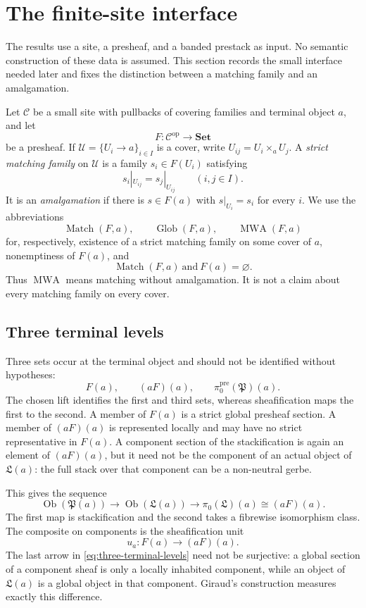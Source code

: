 \section{The finite-site interface}\label{sec:preliminaries}

The results use a site, a presheaf, and a banded prestack as input.  No
semantic construction of these data is assumed.  This section records the
small interface needed later and fixes the distinction between a matching
family and an amalgamation.

Let \(\mathcal C\) be a small site with pullbacks of covering families and
terminal object \(a\), and let
\[
 F:\mathcal C^{\mathrm{op}}\longrightarrow\mathbf {Set}
\]
be a presheaf.  If \(\mathcal U=\{U_i\to a\}_{i\in I}\) is a cover, write
\(U_{ij}=U_i\times_aU_j\).  A \emph{strict matching family} on
\(\mathcal U\) is a family \(s_i\in F(U_i)\) satisfying
\[
 s_i|_{U_{ij}}=s_j|_{U_{ij}}
 \qquad(i,j\in I).
\]
It is an \emph{amalgamation} if there is \(s\in F(a)\) with
\(s|_{U_i}=s_i\) for every \(i\).  We use the abbreviations
\[
 \operatorname{Match}(F,a),\qquad
 \operatorname{Glob}(F,a),\qquad
 \operatorname{MWA}(F,a)
\]
for, respectively, existence of a strict matching family on some cover of
\(a\), nonemptiness of \(F(a)\), and
\[
 \operatorname{Match}(F,a)\ \text{and}\ F(a)=\varnothing.
\]
Thus \(\operatorname{MWA}\) means matching without amalgamation.  It is not
a claim about every matching family on every cover.

\subsection*{Three terminal levels}

Three sets occur at the terminal object and should not be identified without
hypotheses:
\[
 F(a),\qquad (aF)(a),\qquad
 \pi_0^{\mathrm{pre}}(\mathfrak P)(a).
\]
The chosen lift identifies the first and third sets, whereas sheafification
maps the first to the second.  A member of \(F(a)\) is a strict global
presheaf section.  A member of \((aF)(a)\) is represented locally and may
have no strict representative in \(F(a)\).  A component section of the
stackification is again an element of \((aF)(a)\), but it need not be the
component of an actual object of \(\mathfrak L(a)\): the full stack over
that component can be a non-neutral gerbe.

This gives the sequence
\begin{equation}\label{eq:three-terminal-levels}
 \operatorname{Ob}(\mathfrak P(a))
 \longrightarrow
 \operatorname{Ob}(\mathfrak L(a))
 \longrightarrow
 \pi_0(\mathfrak L)(a)
 \cong(aF)(a).
\end{equation}
The first map is stackification and the second takes a fibrewise isomorphism
class.  The composite on components is the sheafification unit
\[
 u_a:F(a)\longrightarrow(aF)(a).
\]
The last arrow in \eqref{eq:three-terminal-levels} need not be surjective:
a global section of a component sheaf is only a locally inhabited
component, while an object of \(\mathfrak L(a)\) is a global object in that
component.  Giraud's construction measures exactly this difference.

